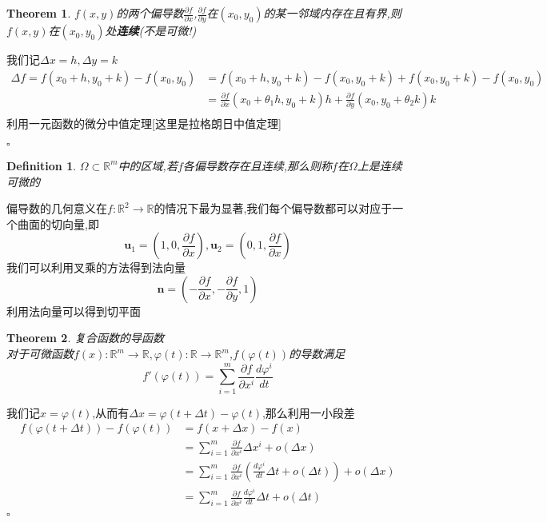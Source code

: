 \documentclass[11pt,hyperref,a4paper,UTF8]{ctexart}
\newtheorem{theorem}{Theorem}[subsection]
\newtheorem{definition}{Definition}[subsection]
\newenvironment{cproof}{%
\heiti{证明}\kaishu
}{%
  \hfill $\square$
  \par\bigskip
}
\newcommand{\RR}{\mathbb{R}}
\newcommand{\parameter}[1]{\left(#1\right)}
\newcommand{\ve}{\boldsymbol}
\begin{document}
\begin{CJK}{UTF8}{gkai}
\begin{theorem}
  $f(x,y)$的两个偏导数$\frac{\partial f}{\partial x}$,$\frac{\partial f}{\partial y}$在$(x_0,y_0)$的某一邻域内存在且有界,则$f(x,y)$在$(x_0,y_0)$处\textbf{连续}(不是可微!)
\end{theorem}

\begin{cproof}
  我们记$\Delta x = h, \Delta y = k$
  \[\begin{aligned}
    \Delta f = f(x_0 + h,y_0 + k) - f(x_0,y_0) &= f(x_0 + h,y_0 + k) - f(x_0,y_0 + k) + f(x_0,y_0 + k) - f(x_0,y_0) \\
    &= \frac{\partial f}{\partial x}(x_0 + \theta_1h,y_0 + k)h + \frac{\partial f}{\partial y}(x_0,y_0 + \theta_2 k)k\\
  \end{aligned}\]
  利用一元函数的微分中值定理[这里是拉格朗日中值定理]

\end{cproof}

\begin{definition}
  $\Omega \subset \RR^m$中的区域,若$f$各偏导数存在且连续,那么则称$f$在$\Omega$上是连续可微的
\end{definition}

偏导数的几何意义在$f:\RR^2\to\RR$的情况下最为显著,我们每个偏导数都可以对应于一个曲面的切向量,即
\[\ve{u}_1 = (1,0,\frac{\partial f}{\partial x}),\ve{u}_2 = (0,1,\frac{\partial f}{\partial x})\]
我们可以利用叉乘的方法得到法向量
\[\ve{n} = (-\frac{\partial f}{\partial x},-\frac{\partial f}{\partial y},1)\]
利用法向量可以得到切平面


\begin{theorem}
  复合函数的导函数\\

  对于可微函数$f(x):\RR^m \to \RR ,\varphi(t): \RR \to \RR^m$,$f(\varphi(t))$的导数满足
  \[f'(\varphi(t)) = \sum_{i = 1}^{m} \frac{\partial f}{\partial x^i}\frac{d\varphi^i}{d t}  \]
\end{theorem}

\begin{cproof}
  我们记$x = \varphi(t)$,从而有$\Delta x = \varphi(t + \Delta t) - \varphi(t)$,那么利用一小段差
  \[\begin{aligned}
    f(\varphi(t + \Delta t)) - f(\varphi(t)) &= f(x + \Delta x) - f(x)\\
    &= \sum_{i = 1}^{m} \frac{\partial f}{\partial x^i} \Delta x^i + o(\Delta x)\\
    &= \sum_{i = 1}^m \frac{\partial f}{\partial x^i}\parameter{\frac{d \varphi^i}{dt}\Delta t + o(\Delta t)} + o(\Delta x)\\
    &= \sum_{i = 1}^m \frac{\partial f}{\partial x^i}\frac{d \varphi^i}{dt}\Delta t + o(\Delta t)\\
  \end{aligned}\]
\end{cproof}


\end{CJK}
\end{document}
